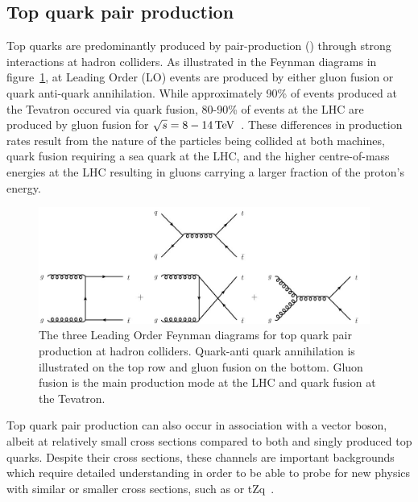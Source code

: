 
\subsection{Top quark pair production}\label{subsec:ttbarTheory}
Top quarks are predominantly produced by pair-production (\ttbar) through strong interactions at hadron colliders.
As illustrated in the Feynman diagrams in figure~\ref{fig:feyn_ttbar}, at Leading Order (LO) \ttbar events are produced by either gluon fusion or quark anti-quark annihilation. 
While approximately 90\% of \ttbar events produced at the Tevatron occured via quark fusion, 80-90\% of \ttbar events at the LHC are produced by gluon fusion for $\sqrt{s} = 8-14\,\text{Te\hspace{-.08em}V}$~\cite{Deliot:2011np,Patrignani:2016xqp}.
These differences in production rates result from the nature of the particles being collided at both machines, \ie quark fusion requiring a sea quark at the LHC, and the higher centre-of-mass energies at the LHC resulting in gluons carrying a larger fraction of the proton's energy.

\begin{figure}[htbp]
\begin{center}
\includegraphics[width=0.97\textwidth]{figs/top-physics/ttbar_feyn.jpg}
\caption{The three Leading Order Feynman diagrams for top quark pair production at hadron colliders. Quark-anti quark annihilation is illustrated on the top row and gluon fusion on the bottom. Gluon fusion is the main production mode at the LHC and quark fusion at the Tevatron.}
\label{fig:feyn_ttbar}
\end{center}
\end{figure}

Top quark pair production can also occur in association with a vector boson, albeit at relatively small cross sections compared to both \ttbar and singly produced top quarks.
Despite their cross sections, these channels are important backgrounds which require detailed understanding in order to be able to probe for new physics with similar or smaller cross sections, such as \ttH or tZq~\cite{Khachatryan:2014ewa}.

